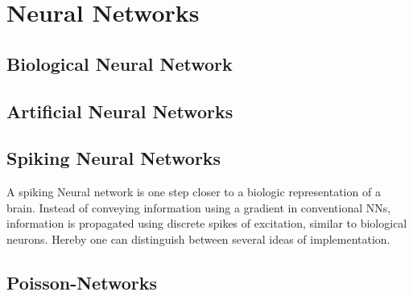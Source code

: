 \section{Neural Networks}

\subsection{Biological Neural Network}

\subsection{Artificial Neural Networks}
\subsection{Spiking Neural Networks}
A spiking Neural network is one step closer to a biologic representation of a brain. Instead of conveying information using a gradient in conventional \ac{NN}s, information is propagated using discrete spikes of excitation, similar to biological neurons. Hereby one can distinguish between several ideas of implementation.

\subsection{Poisson-Networks}

